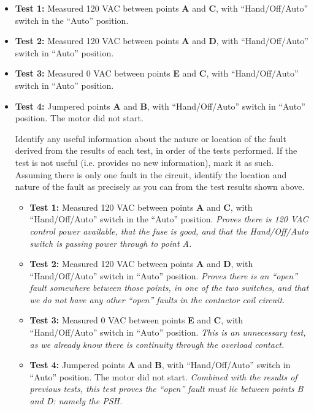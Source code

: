 \begin{itemize}
\item{} {\bf Test 1:} Measured 120 VAC between points {\bf A} and {\bf C}, with ``Hand/Off/Auto'' switch in the ``Auto'' position.
\vskip 25pt
\item{} {\bf Test 2:} Measured 120 VAC between points {\bf A} and {\bf D}, with ``Hand/Off/Auto'' switch in ``Auto'' position.
\vskip 25pt
\item{} {\bf Test 3:} Measured 0 VAC between points {\bf E} and {\bf C}, with ``Hand/Off/Auto'' switch in ``Auto'' position.
\vskip 25pt
\item{} {\bf Test 4:} Jumpered points {\bf A} and {\bf B}, with ``Hand/Off/Auto'' switch in ``Auto'' position.  The motor did not start.
\vskip 25pt
\medskip

Identify any useful information about the nature or location of the fault derived from the results of each test, in order of the tests performed.  If the test is not useful (i.e. provides no new information), mark it as such.  Assuming there is only one fault in the circuit, identify the location and nature of the fault as precisely as you can from the test results shown above.

\vfil 

\eject






\begin{itemize}
\item{} {\bf Test 1:} Measured 120 VAC between points {\bf A} and {\bf C}, with ``Hand/Off/Auto'' switch in the ``Auto'' position.  {\it Proves there is 120 VAC control power available, that the fuse is good, and that the Hand/Off/Auto switch is passing power through to point A.}
\vskip 5pt
\item{} {\bf Test 2:} Measured 120 VAC between points {\bf A} and {\bf D}, with ``Hand/Off/Auto'' switch in ``Auto'' position.  {\it Proves there is an ``open'' fault somewhere between those points, in one of the two switches, and that we do not have any other ``open'' faults in the contactor coil circuit.}
\vskip 5pt
\item{} {\bf Test 3:} Measured 0 VAC between points {\bf E} and {\bf C}, with ``Hand/Off/Auto'' switch in ``Auto'' position.  {\it This is an unnecessary test, as we already know there is continuity through the overload contact.}
\vskip 5pt
\item{} {\bf Test 4:} Jumpered points {\bf A} and {\bf B}, with ``Hand/Off/Auto'' switch in ``Auto'' position.  The motor did not start.  {\it Combined with the results of previous tests, this test proves the ``open'' fault must lie between points B and D: namely the PSH.}
\end{itemize}


\end{itemize}
